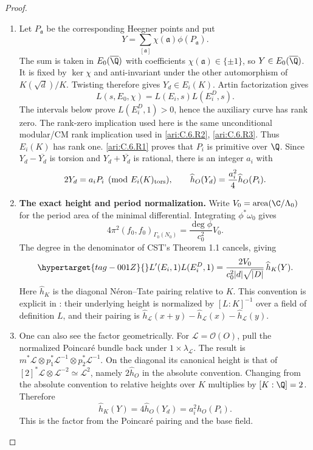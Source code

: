 \begin{proof}
\begin{enumerate}[label=\arabic*.,leftmargin=*]
\item Let $P_{\mathfrak a}$ be the corresponding Heegner points and put
\[
 Y=\sum_{[\mathfrak a]}\chi(\mathfrak a)\phi(P_{\mathfrak a}).
\]
The sum is taken in $E_0(\overline{\Q})$ with coefficients
$\chi(\mathfrak a)\in\{\pm1\}$, so $Y\in E_0(\overline{\Q})$. It is fixed
by $\ker\chi$ and anti-invariant under the other automorphism of
$K(\sqrt d)/K$. Twisting therefore gives $Y_d\in E_i(K)$.
Artin factorization gives
\[
 L(s,E_0,\chi)=L(E_i,s)L(E_i^D,s).
\]
The intervals below prove $L(E_i^D,1)>0$, hence the auxiliary
curve has rank zero. The rank-zero implication used here is the
same unconditional modular/CM rank implication used in \cref{ari:C.6.R2}, \cref{ari:C.6.R3}.
Thus $E_i(K)$ has rank one. \ref{ari:C.6.R1} proves that $P_i$ is primitive
over $\Q$. Since $Y_d-\overline{Y_d}$ is torsion and
$Y_d+\overline{Y_d}$ is rational, there is an integer $a_i$ with
\[
 2Y_d=a_iP_i\pmod{E_i(K)_{\rm tors}},\qquad
 \widehat h_O(Y_d)=\frac{a_i^2}{4}\widehat h_O(P_i).
\]

\item \textbf{The exact height and period normalization.}
Write $V_0=\operatorname{area}(\C/\Lambda_0)$ for the period area
of the minimal differential. Integrating $\phi^*\omega_0$ gives
\[
 4\pi^2(f_0,f_0)_{\Gamma_0(N_0)}
   =\frac{\deg\phi}{c_0^2}V_0.
\]
The degree in the denominator of CST's Theorem 1.1 cancels, giving
\begin{equation}\hypertarget{tag-001Z}{}\label{ari:eq:Cgz-product}
 L'(E_i,1)L(E_i^D,1)
  =\frac{2V_0}{c_0^2|d|\sqrt{|D|}}\,\widehat h_K(Y).
\end{equation}
Here $\widehat h_K$ is the diagonal N\'eron--Tate pairing relative
to $K$. This convention is explicit in
\citet[\S7.1.1, pp.~218--219, Theorem 7.1.2]{CgzYZZ2011}:
their underlying height is normalized by $[L:K]^{-1}$ over a
field of definition $L$, and their pairing is
$\widehat h_{\mathcal L}(x+y)-\widehat h_{\mathcal L}(x)
-\widehat h_{\mathcal L}(y)$.

\item One can also see the factor geometrically. For
$\mathcal L=\mathcal O(O)$, pull the normalized Poincar\'e bundle
back under $1\times\lambda_{\mathcal L}$. The result is
$m^*\mathcal L\otimes p_1^*\mathcal L^{-1}\otimes
p_2^*\mathcal L^{-1}$. On the diagonal its canonical height is
that of $[2]^*\mathcal L\otimes\mathcal L^{-2}\simeq
\mathcal L^2$, namely $2\widehat h_O$ in the absolute convention.
Changing from the absolute convention to relative heights over
$K$ multiplies by $[K:\Q]=2$. Therefore
\[
 \widehat h_K(Y)=4\widehat h_O(Y_d)
                =a_i^2\widehat h_O(P_i).
\]
This is the factor from the Poincar\'e pairing and the base field.


\end{enumerate}
\end{proof}
